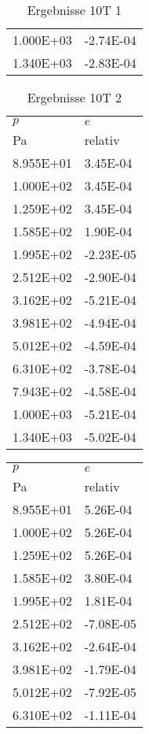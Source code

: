 \begin{table}
\begin{tabular}{l l }
\num{1.000E+03}&\num{-2.74E-04}\\
\num{1.340E+03}&\num{-2.83E-04}\\
\bottomrule
\end{tabular}\caption{Ergebnisse 10T 1}\end{table}\begin{table}\begin{tabular}{l l }
\toprule
$p$&$e$\\
 Pa & relativ \\\midrule
\num{8.955E+01}&\num{3.45E-04}\\
\num{1.000E+02}&\num{3.45E-04}\\
\num{1.259E+02}&\num{3.45E-04}\\
\num{1.585E+02}&\num{1.90E-04}\\
\num{1.995E+02}&\num{-2.23E-05}\\
\num{2.512E+02}&\num{-2.90E-04}\\
\num{3.162E+02}&\num{-5.21E-04}\\
\num{3.981E+02}&\num{-4.94E-04}\\
\num{5.012E+02}&\num{-4.59E-04}\\
\num{6.310E+02}&\num{-3.78E-04}\\
\num{7.943E+02}&\num{-4.58E-04}\\
\num{1.000E+03}&\num{-5.21E-04}\\
\num{1.340E+03}&\num{-5.02E-04}\\
\bottomrule
\end{tabular}\caption{Ergebnisse 10T 2}\end{table}\begin{table}\begin{tabular}{l l }
\toprule
$p$&$e$\\
 Pa & relativ \\\midrule
\num{8.955E+01}&\num{5.26E-04}\\
\num{1.000E+02}&\num{5.26E-04}\\
\num{1.259E+02}&\num{5.26E-04}\\
\num{1.585E+02}&\num{3.80E-04}\\
\num{1.995E+02}&\num{1.81E-04}\\
\num{2.512E+02}&\num{-7.08E-05}\\
\num{3.162E+02}&\num{-2.64E-04}\\
\num{3.981E+02}&\num{-1.79E-04}\\
\num{5.012E+02}&\num{-7.92E-05}\\
\num{6.310E+02}&\num{-1.11E-04}\\

\end{tabular}
\end{table}
